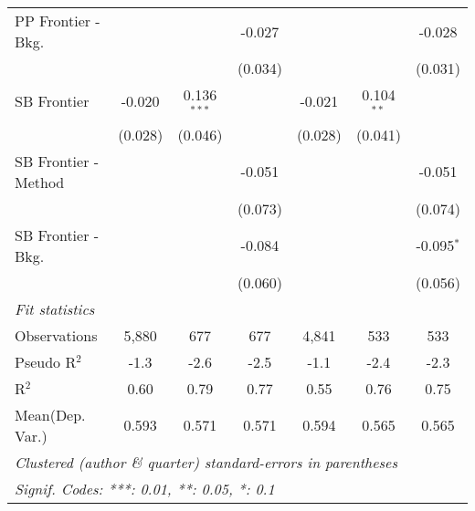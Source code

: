 \begin{tabular}{lcccccc}
   PP Frontier - Bkg.   &              &               & -0.027      &              &               & -0.028\\   
                        &              &               & (0.034)     &              &               & (0.031)\\   
   SB Frontier          & -0.020       & 0.136$^{***}$ &             & -0.021       & 0.104$^{**}$  &   \\   
                        & (0.028)      & (0.046)       &             & (0.028)      & (0.041)       &   \\   
   SB Frontier - Method &              &               & -0.051      &              &               & -0.051\\   
                        &              &               & (0.073)     &              &               & (0.074)\\   
   SB Frontier - Bkg.   &              &               & -0.084      &              &               & -0.095$^{*}$\\   
                        &              &               & (0.060)     &              &               & (0.056)\\   
   \midrule
   \emph{Fit statistics}\\
   Observations         & 5,880        & 677           & 677         & 4,841        & 533           & 533\\  
   Pseudo R$^2$         & -1.3         & -2.6          & -2.5        & -1.1         & -2.4          & -2.3\\  
   R$^2$                & 0.60         & 0.79          & 0.77        & 0.55         & 0.76          & 0.75\\  
Mean(Dep. Var.) & 0.593 & 0.571 & 0.571 & 0.594 & 0.565 & 0.565 \\
   \midrule \midrule
   \multicolumn{7}{l}{\emph{Clustered (author \& quarter) standard-errors in parentheses}}\\
   \multicolumn{7}{l}{\emph{Signif. Codes: ***: 0.01, **: 0.05, *: 0.1}}\\
\end{tabular}
\par\endgroup
